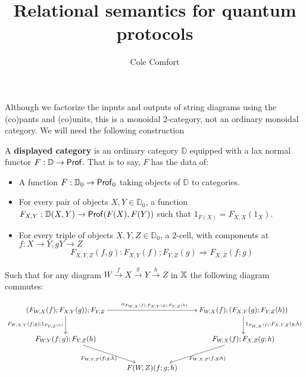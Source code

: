 \documentclass[12pt]{ociamthesis}  %
\title{Relational semantics for quantum protocols}
\author{Cole Comfort}
\begin{document}
\maketitle


\newcommand{\D}{\mathbb{D}}




Although we factorize the inputs and outputs of string diagrams using the (co)pants and (co)units, this is a monoidal 2-category, not an ordinary monoidal category.  We will need the following construction


\begin{definition}
\newcommand{\D}{\mathbb{D}}
A {\bf displayed category} is an ordinary category $\D$ equipped with a lax normal functor $F:\D\to \Prof$.
That is to say, $F$ has the data of:

\begin{itemize}
\item A function $F:\D_0\to \Prof_0$ taking objects of $\D$ to categories.
\item For every pair of objects $X,Y \in \D_0$, a function $F_{X,Y}:\D(X,Y)\to \Prof(F(X),F(Y))$  such that $1_{F(X)}=F_{X,X}(1_X)$.
\item For every triple of objects $X,Y,Z \in \D_0$, a $2$-cell, with components at $f:X\to Y,gY\to Z$
$$F_{X,Y,Z}(f,g):F_{X,Y}(f);F_{Y,Z}(g) \Rightarrow F_{X,Z}(f;g)$$
\end{itemize}

Such that for any diagram $W\xrightarrow{f} X \xrightarrow{g} Y \xrightarrow{h} Z$ in $\mathbb{X}$ the following diagram commutes:


$$
\xymatrix{
(F_{W,X}(f);F_{X,Y}(g));F_{Y,Z} \ar[d]_{F_{W,X,Y}(f;g);1_{F_{Y,Z}(h)}} \ar[rr]^{\alpha_{F_{W,X}(f),F_{X,Y}(g),F_{Y,Z}(h)}}
  & & F_{W,X}(f);(F_{X,Y}(g);F_{Y,Z}(h)) \ar[d]^{1_{F_{W,X}(f)};F_{X,Y,Z}(g,h)}\\
F_{W,Y}(f;g);F_{Y,Z}(h) \ar[dr]_{F_{W,Y,Z}(f;g,h) \ \ }
  && F_{W,X}(f);F_{X,Z}(g;h) \ar[dl]^{\ \ F_{W,X,Z}(f,g;h)}\\
  & F(W,Z)(f;g;h)
}
$$
\end{definition}
\end{document}

